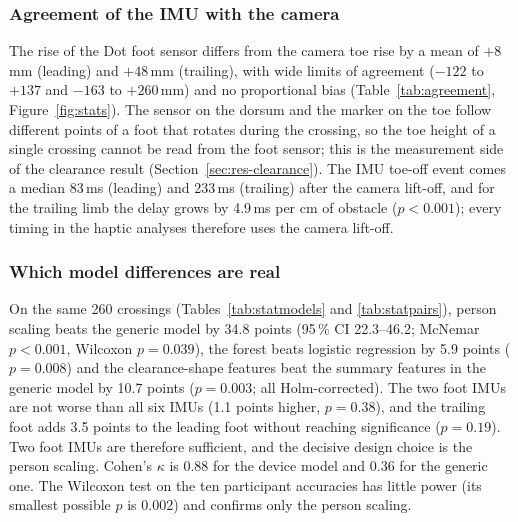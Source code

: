 \subsubsection{Agreement of the IMU with the camera}

The rise of the Dot foot sensor differs from the camera toe rise by a mean of $+8$\,mm (leading) and $+48$\,mm (trailing), with
wide limits of agreement ($-122$ to $+137$ and $-163$ to $+260$\,mm) and no proportional bias (Table~\ref{tab:agreement},
Figure~\ref{fig:stats}). The sensor on the dorsum and the marker on the toe follow different points of a foot that rotates during
the crossing, so the toe height of a single crossing cannot be read from the foot sensor; this is the measurement side of the
clearance result (Section~\ref{sec:res-clearance}). The IMU toe-off event comes a median 83\,ms (leading) and 233\,ms (trailing)
after the camera lift-off, and for the trailing limb the delay grows by 4.9\,ms per cm of obstacle ($p < 0.001$); every timing
in the haptic analyses therefore uses the camera lift-off.

\begin{table}[htbp]
\centering
\caption{Agreement of the IMU with the camera: foot lift (Dot sensor rise minus camera toe rise; Bland--Altman) and toe-off time
(IMU step-4 toe-off minus camera lift-off).}
\label{tab:agreement}

\end{table}

\subsubsection{Which model differences are real}

On the same 260 crossings (Tables~\ref{tab:statmodels} and \ref{tab:statpairs}), person scaling beats the generic model by 34.8
points (95\,\% CI 22.3--46.2; McNemar $p < 0.001$, Wilcoxon $p = 0.039$), the forest beats logistic regression by 5.9 points
($p = 0.008$) and the clearance-shape features beat the summary features in the generic model by 10.7 points ($p = 0.003$; all
Holm-corrected). The two foot IMUs are not worse than all six IMUs (1.1 points higher, $p = 0.38$), and the trailing foot adds
3.5 points to the leading foot without reaching significance ($p = 0.19$). Two foot IMUs are therefore sufficient, and the
decisive design choice is the person scaling. Cohen's $\kappa$ is 0.88 for the device model and 0.36 for the generic one. The
Wilcoxon test on the ten participant accuracies has little power (its smallest possible $p$ is 0.002) and confirms only the
person scaling.

